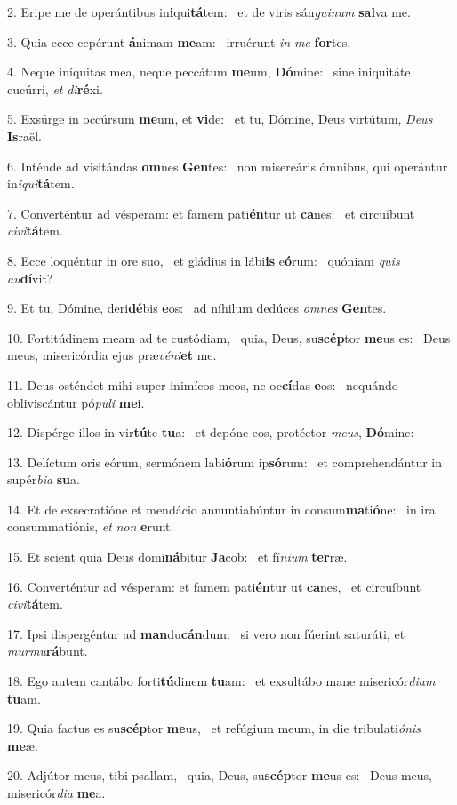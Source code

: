 2. Eripe me de operántibus in\textbf{i}qui\textbf{tá}tem: \ast\  et de viris sán\textit{gui}\textit{num} \textbf{sal}va me.\

3. Quia ecce cepérunt \textbf{á}nimam \textbf{me}am: \ast\  irruérunt \textit{in} \textit{me} \textbf{for}tes.\

4. Neque iníquitas mea, neque peccátum \textbf{me}um, \textbf{Dó}mine: \ast\  sine iniquitáte cucúrri, \textit{et} \textit{di}\textbf{ré}xi.\

5. Exsúrge in occúrsum \textbf{me}um, et \textbf{vi}de: \ast\  et tu, Dómine, Deus virtútum, \textit{De}\textit{us} \textbf{Is}raël.\

6. Inténde ad visitándas \textbf{om}nes \textbf{Gen}tes: \ast\  non misereáris ómnibus, qui operántur in\textit{i}\textit{qui}\textbf{tá}tem.\

7. Converténtur ad vésperam: et famem pati\textbf{én}tur ut \textbf{ca}nes: \ast\  et circuíbunt \textit{ci}\textit{vi}\textbf{tá}tem.\

8. Ecce loquéntur in ore suo, \dag\  et gládius in lábi\textbf{is} e\textbf{ó}rum: \ast\  quóniam \textit{quis} \textit{au}\textbf{dí}vit?\

9. Et tu, Dómine, deri\textbf{dé}bis \textbf{e}os: \ast\  ad níhilum dedúces \textit{om}\textit{nes} \textbf{Gen}tes.\

10. Fortitúdinem meam ad te custódiam, \dag\  quia, Deus, su\textbf{scép}tor \textbf{me}us es: \ast\  Deus meus, misericórdia ejus præ\textit{vé}\textit{ni}\textbf{et} me.\

11. Deus osténdet mihi super inimícos meos, ne oc\textbf{cí}das \textbf{e}os: \ast\  nequándo obliviscántur pó\textit{pu}\textit{li} \textbf{me}i.\

12. Dispérge illos in vir\textbf{tú}te \textbf{tu}a: \ast\  et depóne eos, protéctor \textit{me}\textit{us}, \textbf{Dó}mine:\

13. Delíctum oris eórum, sermónem labi\textbf{ó}rum ip\textbf{só}rum: \ast\  et comprehendántur in supér\textit{bi}\textit{a} \textbf{su}a.\

14. Et de exsecratióne et mendácio annuntiabúntur in consum\textbf{ma}ti\textbf{ó}ne: \ast\  in ira consummatiónis, \textit{et} \textit{non} \textbf{e}runt.\

15. Et scient quia Deus domi\textbf{ná}bitur \textbf{Ja}cob: \ast\  et fí\textit{ni}\textit{um} \textbf{ter}ræ.\

16. Converténtur ad vésperam: et famem pati\textbf{én}tur ut \textbf{ca}nes, \ast\  et circuíbunt \textit{ci}\textit{vi}\textbf{tá}tem.\

17. Ipsi dispergéntur ad \textbf{man}du\textbf{cán}dum: \ast\  si vero non fúerint saturáti, et \textit{mur}\textit{mu}\textbf{rá}bunt.\

18. Ego autem cantábo forti\textbf{tú}dinem \textbf{tu}am: \ast\  et exsultábo mane misericór\textit{di}\textit{am} \textbf{tu}am.\

19. Quia factus es su\textbf{scép}tor \textbf{me}us, \ast\  et refúgium meum, in die tribulati\textit{ó}\textit{nis} \textbf{me}æ.\

20. Adjútor meus, tibi psallam, \dag\  quia, Deus, su\textbf{scép}tor \textbf{me}us es: \ast\  Deus meus, misericór\textit{di}\textit{a} \textbf{me}a.\

